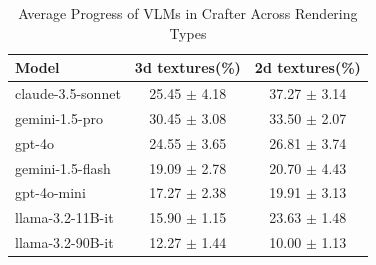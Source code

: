 \begin{table}[h]
\centering
\caption{Average Progress of VLMs in Crafter Across Rendering Types}
\begin{tabular}{lcc}
\hline
Model & 3d textures(\%) & 2d textures(\%) \\
\hline
claude-3.5-sonnet & 25.45 $\pm$ 4.18 &    37.27 $\pm$ 3.14 \\
gemini-1.5-pro & 30.45 $\pm$ 3.08 &      33.50 $\pm$ 2.07  \\
gpt-4o & 24.55 $\pm$ 3.65 &       26.81 $\pm$ 3.74  \\
gemini-1.5-flash & 19.09 $\pm$ 2.78 &   20.70 $\pm$ 4.43 \\
gpt-4o-mini & 17.27 $\pm$ 2.38 &       19.91 $\pm$ 3.13 \\
llama-3.2-11B-it & 15.90 $\pm$ 1.15 &     23.63 $\pm$ 1.48 \\
llama-3.2-90B-it & 12.27 $\pm$ 1.44 &    10.00 $\pm$ 1.13 \\
\hline
\end{tabular}
\label{Crafter_Ablation}
\end{table}
